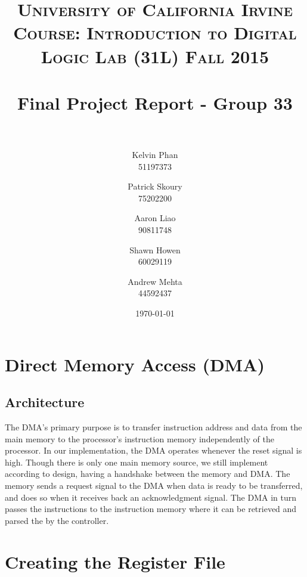 \documentclass[paper=letter, fontsize=11pt]{scrartcl}
\title{	
\normalfont \normalsize 
\textsc{University of California Irvine} \\  %
\textsc{Course: Introduction to Digital Logic Lab (31L) Fall 2015} \\ [25pt]
\horrule{0.5pt} \\[0.4cm] %
\huge Final Project Report - Group 33\\ %
\horrule{2pt} \\[0.5cm] %
}
\author{Kelvin Phan \\ 51197373
	\and
	Patrick Skoury \\ 75202200
	\and
	Aaron Liao \\ 90811748
	\and
	Shawn Howen \\ 60029119
	\and
	Andrew Mehta \\ 44592437
}
\date{\large\today} %
\numberwithin{equation}{section} %
\numberwithin{figure}{section} %
\numberwithin{table}{section} %
\begin{document}
\maketitle %


\section{Direct Memory Access (DMA)}

\subsection{Architecture}
\begin{flushleft}
	The DMA's primary purpose is to transfer instruction address and data from the main memory to the processor's instruction memory independently of the processor. In our implementation, the DMA operates whenever the reset signal is high. Though there is only one main memory source, we still implement according to design, having a handshake between the memory and DMA. The memory sends a request signal to the DMA when data is ready to be transferred, and does so when it receives back an acknowledgment signal. The DMA in turn passes the instructions to the instruction memory where it can be retrieved and parsed the by the controller. \\[20pt]
\end{flushleft}


\section{Creating the Register File}
\end{document}

